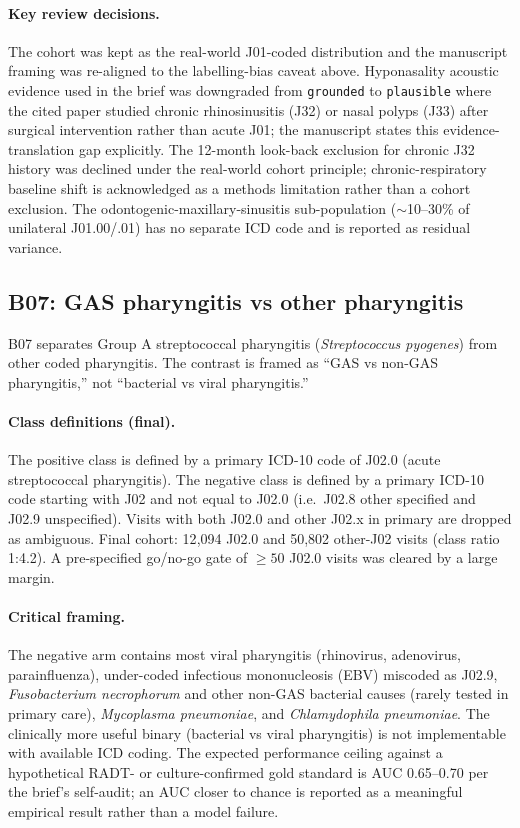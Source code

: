 \documentclass[utf8]{frontiers_suppmat} %
\begin{document}
\paragraph{Key review decisions.} The cohort was kept as the
real-world J01-coded distribution and the manuscript framing was
re-aligned to the labelling-bias caveat above. Hyponasality acoustic
evidence used in the brief was downgraded from \texttt{grounded} to
\texttt{plausible} where the cited paper studied chronic rhinosinusitis
(J32) or nasal polyps (J33) after surgical intervention rather than
acute J01; the manuscript states this evidence-translation gap
explicitly. The 12-month look-back exclusion for chronic J32 history
was declined under the real-world cohort principle; chronic-respiratory
baseline shift is acknowledged as a methods limitation rather than
a cohort exclusion. The odontogenic-maxillary-sinusitis sub-population
($\sim$10--30\% of unilateral J01.00/.01) has no separate ICD code
and is reported as residual variance.

\subsection{B07: GAS pharyngitis vs other pharyngitis}
\label{sec:supp-b07}

B07 separates Group A streptococcal pharyngitis (\textit{Streptococcus
pyogenes}) from other coded pharyngitis. The contrast is framed as
``GAS vs non-GAS pharyngitis,'' not ``bacterial vs viral pharyngitis.''

\paragraph{Class definitions (final).} The positive class is defined
by a primary ICD-10 code of J02.0 (acute streptococcal pharyngitis).
The negative class is defined by a primary ICD-10 code starting with
J02 and not equal to J02.0 (i.e.\ J02.8 other specified and J02.9
unspecified). Visits with both J02.0 and other J02.x in primary are
dropped as ambiguous. Final cohort: 12{,}094 J02.0 and 50{,}802
other-J02 visits (class ratio 1:4.2). A pre-specified go/no-go gate
of $\geq 50$ J02.0 visits was cleared by a large margin.

\paragraph{Critical framing.} The negative arm contains most viral
pharyngitis (rhinovirus, adenovirus, parainfluenza), under-coded
infectious mononucleosis (EBV) miscoded as J02.9, \textit{Fusobacterium
necrophorum} and other non-GAS bacterial causes (rarely tested in
primary care), \textit{Mycoplasma pneumoniae}, and \textit{Chlamydophila
pneumoniae}. The clinically more useful binary (bacterial vs viral
pharyngitis) is not implementable with available ICD coding. The
expected performance ceiling against a hypothetical RADT- or
culture-confirmed gold standard is AUC 0.65--0.70 \citep{gas-clinical-criteria-ceiling} per the brief's
self-audit; an AUC closer to chance is reported as a meaningful
empirical result rather than a model failure.
\end{document}
